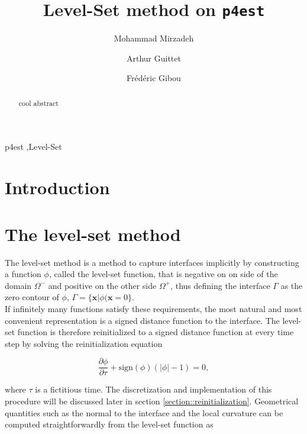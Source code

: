\documentclass{elsarticle}
\newcommand{\pd}[2]{\frac{\partial #1}{\partial #2}}
\begin{document}
\begin{frontmatter}
\title{Level-Set method on \texttt{p4est}}


\address[MECHE]{Department of Mechanical Engineering, University of California, Santa Barbara, CA 93106-5070}
\address[CS]{Department of Computer Science, University of California, Santa Barbara, CA 93106-5110}

 \author[MECHE]{Mohammad Mirzadeh} \author[MECHE]{Arthur Guittet} \author[MECHE,CS]{Fr\'ed\'eric Gibou}

\begin{abstract}
cool abstract
\end{abstract}
\begin{keyword}
p4est \sep Level-Set
\end{keyword}

\end{frontmatter}

\section{Introduction}

\section{The level-set method}

\indent The level-set method is a method to capture interfaces implicitly by constructing a function $\phi$, called the level-set function, that is negative on on side of the domain $\Omega^-$ and positive on the other side $\Omega^+$, thus defining the interface $\Gamma$ as the zero contour of $\phi$, $\Gamma = \{\mathbf{x} \vert \phi(\mathbf{x}=0\}$.\\

If infinitely many functions satisfy these requirements, the most natural and most convenient representation is a signed distance function to the interface. The level-set function is therefore reinitialized to a signed distance function at every time step by solving the reinitialization equation

\begin{equation} \label{eq::reinitialization}
\pd{\phi}{\tau} + \mathrm{sign}(\phi) \left( \lvert \phi \rvert - 1 \right) = 0,
\end{equation}

where $\tau$ is a fictitious time. The discretization and implementation of this procedure will be discussed later in section \ref{section::reinitialization}. Geometrical quantities such as the normal to the interface and the local curvature can be computed straightforwardly from the level-set function as
\end{document}
